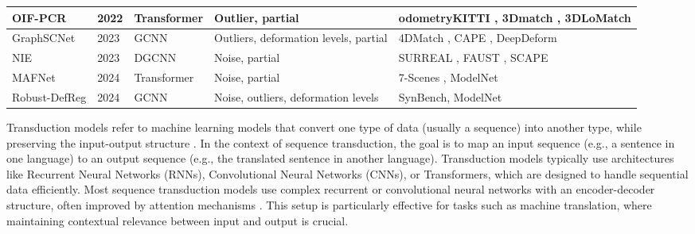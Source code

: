 \begin{table*}
\begin{tabular}{p{2.25cm} p{1cm} p{2.5cm} p{4cm} p{6cm}}
OIF-PCR \cite{yang2022one} &2022&Transformer&Outlier, partial&odometryKITTI \cite{geiger2013vision}, 3Dmatch \cite{zeng20173dmatch}, 3DLoMatch \cite{huang2021predator}\\\hline

GraphSCNet \cite{qin2023deep}&2023&GCNN&Outliers, deformation levels, partial & 4DMatch \cite{li2022lepard}, CAPE \cite{pons2017clothcap}, DeepDeform \cite{bozic2020deepdeform}\\
\hline

NIE \cite{jiang2023neural}&2023&DGCNN&Noise, partial &SURREAL \citep{varol2017learning}, FAUST \cite{bogo2014faust}, SCAPE \cite{anguelov2005scape}\\
\hline

MAFNet \cite{chen2024mafnet}&2024&Transformer&Noise, partial&7-Scenes \citep{shotton2013scene}, ModelNet \citep{wu20153d}\\
\hline

Robust-DefReg\cite{monji2024robust} &2024&GCNN&Noise, outliers, deformation levels&SynBench\cite{DataSynBench}, ModelNet \citep{wu20153d}\\
\hline

\end{tabular}
\end{table*}

Transduction models refer to machine learning models that convert one type of data (usually a sequence) into another type, while preserving the input-output structure \cite{belhasin2022transboost}. In the context of sequence transduction, the goal is to map an input sequence (e.g., a sentence in one language) to an output sequence (e.g., the translated sentence in another language). Transduction models typically use architectures like Recurrent Neural Networks (RNNs), Convolutional Neural Networks (CNNs), or Transformers, which are designed to handle sequential data efficiently. Most sequence transduction models use complex recurrent or convolutional neural networks with an encoder-decoder structure, often improved by attention mechanisms \cite{chalvidal2024learning}. This setup is particularly effective for tasks such as machine translation, where maintaining contextual relevance between input and output is crucial.

